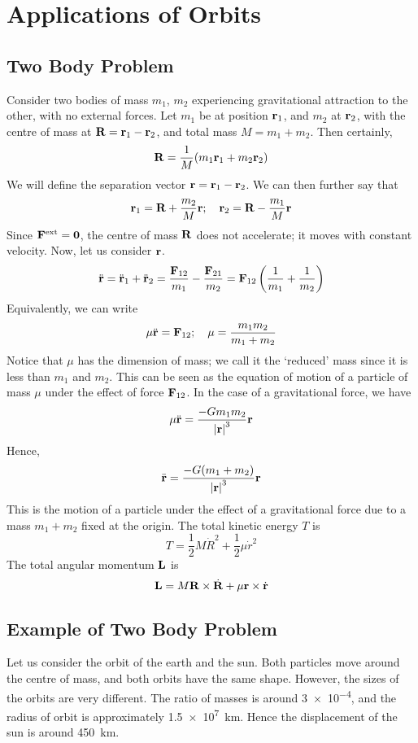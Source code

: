 \documentclass{article}
\begin{document}
\section{Applications of Orbits}
\subsection{Two Body Problem}
Consider two bodies of mass $m_1$, $m_2$ experiencing gravitational attraction to the other, with no external forces. Let $m_1$ be at position $\vb r_1$, and $m_2$ at $\vb r_2$, with the centre of mass at $\vb R = \vb r_1 - \vb r_2$, and total mass $M = m_1 + m_2$. Then certainly,
\[ \vb R = \frac{1}{M}(m_1 \vb r_1 + m_2 \vb r_2) \]
We will define the separation vector $\vb r = \vb r_1 - \vb r_2$. We can then further say that
\[ \vb r_1 = \vb R + \frac{m_2}{M}\vb r;\quad \vb r_2 = \vb R - \frac{m_1}{M}\vb r \]
Since $\vb F^\text{ext} = \vb 0$, the centre of mass $\vb R$ does not accelerate; it moves with constant velocity. Now, let us consider $\vb r$.
\[ \ddot{\vb r} = \ddot{\vb r}_1 + \ddot{\vb r}_2 = \frac{\vb F_{12}}{m_1} - \frac{\vb F_{21}}{m_2} = \vb F_{12} \left( \frac{1}{m_1} + \frac{1}{m_2} \right) \]
Equivalently, we can write
\[ \mu\ddot{\vb r} = \vb F_{12};\quad \mu = \frac{m_1 m_2}{m_1 + m_2} \]
Notice that $\mu$ has the dimension of mass; we call it the `reduced' mass since it is less than $m_1$ and $m_2$. This can be seen as the equation of motion of a particle of mass $\mu$ under the effect of force $\vb F_{12}$. In the case of a gravitational force, we have
\[ \mu \ddot{\vb r} = \frac{-Gm_1m_2}{\abs{\vb r}^3}\vb r \]
Hence,
\[ \ddot{\vb r} = \frac{-G(m_1 + m_2)}{\abs{\vb r}^3}\vb r \]
This is the motion of a particle under the effect of a gravitational force due to a mass $m_1 + m_2$ fixed at the origin. The total kinetic energy $T$ is
\[ T = \frac{1}{2}M\dot R^2 + \frac{1}{2}\mu \dot r^2 \]
The total angular momentum $\vb L$ is
\[ \vb L = M \vb R \times \dot{\vb R} + \mu \vb r \times \dot{\vb r} \]

\subsection{Example of Two Body Problem}
Let us consider the orbit of the earth and the sun. Both particles move around the centre of mass, and both orbits have the same shape. However, the sizes of the orbits are very different. The ratio of masses is around \num{3e-4}, and the radius of orbit is approximately \SI{1.5e7}{\kilo\metre}. Hence the displacement of the sun is around \SI{450}{\kilo\metre}.
\end{document}
